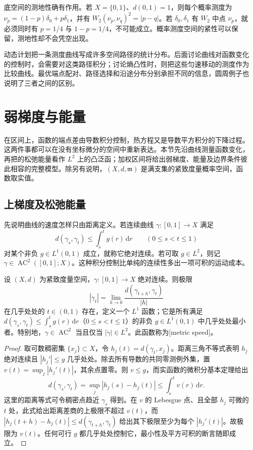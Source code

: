 底空间的测地性确有作用。若 \(X=\{0,1\}\)、\(d(0,1)=1\)，则每个概率测度为
\(\nu_p=(1-p)\delta_0+p\delta_1\)，并有
\(W_2(\nu_p,\nu_q)^2=|p-q|\)。若 \(\delta_0,\delta_1\) 有 \(W_2\) 中点 \(\nu_p\)，就必须同时有 \(p=1/4\) 与 \(1-p=1/4\)，不可能成立。概率测度空间的紧性可以保留，测地性却不会凭空出现。

\ProseParagraphBreak
动态计划把一条测度曲线写成许多空间路径的统计分布。后面讨论曲线对函数变化的控制时，会需要对这类路径积分；讨论熵凸性时，则把这些匀速移动的测度作为比较曲线。最优端点配对、路径选择和沿途分布分别承担不同的信息，圆周例子也说明了三者之间的区别。

\section{弱梯度与能量}
\label{g3:sec:C02}
在区间上，函数的端点差由导数积分控制，热方程又是导数平方积分的下降过程。这两件事都可以在没有坐标微分的空间中重新表达。本节先沿曲线测量函数变化，再把的松弛能量看作 \(L^2\) 上的凸泛函；加权区间将给出弱梯度、能量及边界条件彼此相容的完整模型。除另有说明，\((X,d,\mathfrak m)\) 是满支集的紧致度量概率空间，函数取实值。

\subsection{上梯度及松弛能量}
\label{g3:subsec:C02:01}
先说明曲线的速度怎样只由距离定义。若连续曲线 \(\gamma:[0,1]\to X\) 满足
\[
	d(\gamma_s,\gamma_t)\le\int_s^t g(r)\,\mathrm dr
	\qquad(0\le s<t\le1)
\]
对某个非负 \(g\in L^1(0,1)\) 成立，就称它绝对连续。若可取 \(g\in L^2\)，则记 \(\gamma\in\operatorname{AC}^2([0,1];X)\)。这种积分控制比单纯的连续性多出一项可积的运动成本。

\begin{lemma}\label{g3:lem:C-metric-speed}
	设 \((X,d)\) 为紧致度量空间，\(\gamma:[0,1]\to X\) 绝对连续。则极限
	\[
		|\dot\gamma_t|=\lim_{h\to0}\frac{d(\gamma_{t+h},\gamma_t)}{|h|}
	\]
	在几乎处处的 \(t\in(0,1)\) 存在，定义一个 \(L^1\) 函数；它是所有满足 \(d(\gamma_s,\gamma_t)\le\int_s^tg(r)\,\mathrm dr\)（\(0\le s<t\le1\)）的非负 \(g\in L^1(0,1)\) 中几乎处处最小者。特别地，\(\gamma\in\operatorname{AC}^2\) 当且仅当 \(|\dot\gamma|\in L^2\)。此函数称为[metric speed]。
\end{lemma}
\begin{proof}
	取可数稠密集 \(\{x_j\}\subset X\)，令 \(h_j(t)=d(\gamma_t,x_j)\)。距离三角不等式表明 \(h_j\) 绝对连续且 \(|h_j'|\le g\) 几乎处处。除去所有导数的共同零测例外集，置 \(v(t)=\sup_j|h_j'(t)|\)，其余点置零。则 \(v\le g\)，而实函数的微积分基本定理给出
	\[
		d(\gamma_s,\gamma_t)
		=\sup_j|h_j(s)-h_j(t)|\le\int_s^t v(r)\,\mathrm dr.
	\]
	这里的距离等式可令稠密点趋近 \(\gamma_s\) 得到。在 \(v\) 的 Lebesgue 点、且全部 \(h_j\) 可微的 \(t\) 处，此式给出距离差商的上极限不超过 \(v(t)\)，而
	\(|h_j(t+h)-h_j(t)|\le d(\gamma_{t+h},\gamma_t)\) 给出其下极限至少为每个 \(|h_j'(t)|\)。故极限为 \(v(t)\)。任何可行 \(g\) 都几乎处处控制它，最小性及平方可积的断言随即成立。
\end{proof}

